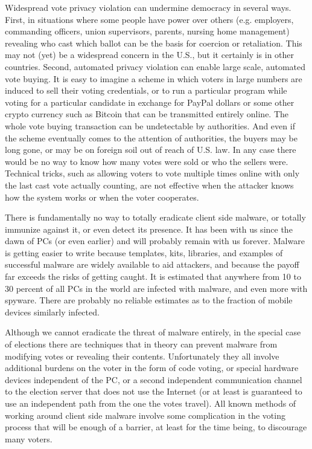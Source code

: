 \begin{enumerate}[label={\roman*})]
  Widespread vote privacy violation can undermine democracy in several
  ways. First, in situations where some people have power over others
  (e.g. employers, commanding officers, union supervisors, parents,
  nursing home management) revealing who cast which ballot can be the
  basis for coercion or retaliation. This may not (yet) be a
  widespread concern in the U.S., but it certainly is in other
  countries.  Second, automated privacy violation can enable large
  scale, automated vote buying.  It is easy to imagine a scheme in
  which voters in large numbers are induced to sell their voting
  credentials, or to run a particular program while voting for a
  particular candidate in exchange for PayPal dollars or some other
  crypto currency such as Bitcoin that can be transmitted entirely
  online. The whole vote buying transaction can be undetectable by
  authorities. And even if the scheme eventually comes to the
  attention of authorities, the buyers may be long gone, or may be on
  foreign soil out of reach of U.S. law.  In any case there would be
  no way to know how many votes were sold or who the sellers
  were. Technical tricks, such as allowing voters to vote multiple
  times online with only the last cast vote actually counting, are not
  effective when the attacker knows how the system works or when the
  voter cooperates.  
\end{enumerate}

There is fundamentally no way to totally eradicate client side
malware, or totally immunize against it, or even detect its
presence. It has been with us since the dawn of PCs (or even earlier)
and will probably remain with us forever. Malware is getting easier to
write because templates, kits, libraries, and examples of successful
malware are widely available to aid attackers, and because the payoff
far exceeds the risks of getting caught. It is estimated that anywhere
from 10 to 30 percent of all PCs in the world are infected with
malware, and even more with spyware.  There are probably no reliable
estimates as to the fraction of mobile devices similarly infected.

Although we cannot eradicate the threat of malware entirely, in the
special case of elections there are techniques that in theory can
prevent malware from modifying votes or revealing their
contents. Unfortunately they all involve additional burdens on the
voter in the form of code voting, or special hardware devices
independent of the PC, or a second independent communication channel
to the election server that does not use the Internet (or at least is
guaranteed to use an independent path from the one the votes
travel). All known methods of working around client side malware
involve some complication in the voting process that will be enough of
a barrier, at least for the time being, to discourage many voters.


